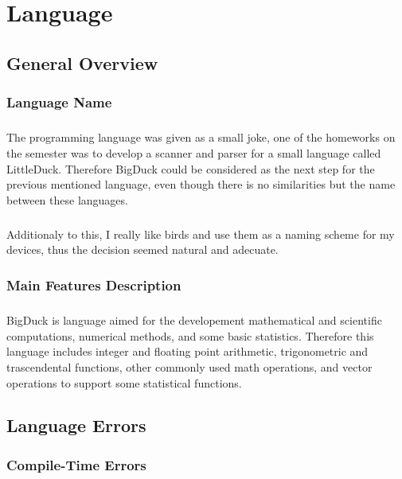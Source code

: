 
\chapter{Language}

\section{General Overview}
\subsection{Language Name}
\paragraph{} The programming language was given as a small joke, one of the
homeworks on the semester was to develop a scanner and parser for a small
language called LittleDuck. Therefore BigDuck could be considered as the next
step for the previous mentioned language, even though there is no similarities
but the name between these languages.

\paragraph{} Additionaly to this, I really like birds and use them as a naming
scheme for my devices, thus the decision seemed natural and adecuate.

\subsection{Main Features Description}
\paragraph{} BigDuck is language aimed for the developement mathematical and
scientific computations, numerical methods, and some basic statistics. Therefore
this language includes integer and floating point arithmetic, trigonometric and
trascendental functions, other commonly used math operations, and vector
operations to support some statistical functions.

\newpage

\section{Language Errors}
\subsection{Compile-Time Errors}


